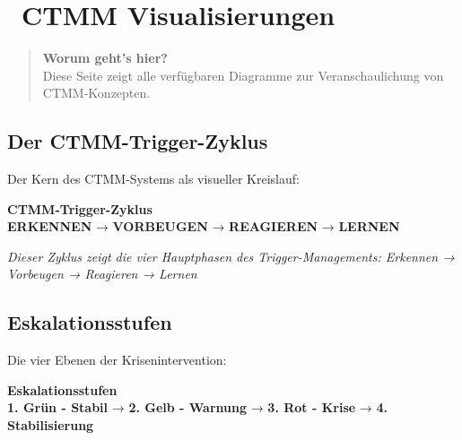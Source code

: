 
\section*{\textcolor{ctmmPurple}{\faChartArea~CTMM Visualisierungen}}

\begin{quote}
\textbf{\textcolor{ctmmPurple}{Worum geht's hier?}}\\
Diese Seite zeigt alle verfügbaren Diagramme zur Veranschaulichung von CTMM-Konzepten.
\end{quote}

\subsection*{\textcolor{ctmmBlue}{Der CTMM-Trigger-Zyklus}}

Der Kern des CTMM-Systems als visueller Kreislauf:

\begin{center}
\begin{tcolorbox}[colback=ctmmBlue!10!white,colframe=ctmmBlue,width=10cm]
\centering
\textbf{CTMM-Trigger-Zyklus}\\[0.5cm]
\textcolor{ctmmBlue}{\textbf{ERKENNEN}} → \textcolor{ctmmGreen}{\textbf{VORBEUGEN}} → \textcolor{ctmmOrange}{\textbf{REAGIEREN}} → \textcolor{ctmmPurple}{\textbf{LERNEN}}
\end{tcolorbox}
\end{center}

\textit{Dieser Zyklus zeigt die vier Hauptphasen des Trigger-Managements: Erkennen → Vorbeugen → Reagieren → Lernen}

\subsection*{\textcolor{ctmmOrange}{Eskalationsstufen}}

Die vier Ebenen der Krisenintervention:

\begin{center}
\begin{tcolorbox}[colback=ctmmOrange!10!white,colframe=ctmmOrange,width=12cm]
\centering
\textbf{Eskalationsstufen}\\[0.5cm]
\textcolor{ctmmGreen}{\textbf{1. Grün - Stabil}} → \textcolor{ctmmOrange}{\textbf{2. Gelb - Warnung}} → \textcolor{ctmmRed}{\textbf{3. Rot - Krise}} → \textcolor{ctmmPurple}{\textbf{4. Stabilisierung}}
\end{tcolorbox}
\end{center}

